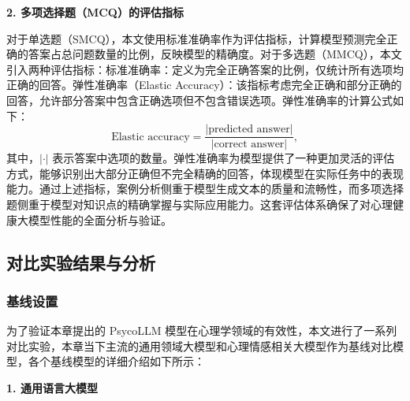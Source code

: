 \textbf{2. 多项选择题（MCQ）的评估指标}

对于单选题（SMCQ），本文使用标准准确率作为评估指标，计算模型预测完全正确的答案占总问题数量的比例，反映模型的精确度。对于多选题（MMCQ），本文引入两种评估指标：标准准确率：定义为完全正确答案的比例，仅统计所有选项均正确的回答。弹性准确率（Elastic Accuracy）：该指标考虑完全正确和部分正确的回答，允许部分答案中包含正确选项但不包含错误选项。弹性准确率的计算公式如下：
\begin{equation}
  \text{Elastic accuracy} = \frac{|\text{predicted answer}|}{|\text{correct answer}|},
\end{equation}
其中，$|\cdot|$ 表示答案中选项的数量。弹性准确率为模型提供了一种更加灵活的评估方式，能够识别出大部分正确但不完全精确的回答，体现模型在实际任务中的表现能力。通过上述指标，案例分析侧重于模型生成文本的质量和流畅性，而多项选择题侧重于模型对知识点的精确掌握与实际应用能力。这套评估体系确保了对心理健康大模型性能的全面分析与验证。

\subsection{对比实验结果与分析}

\subsubsection{基线设置}

为了验证本章提出的 PsycoLLM 模型在心理学领域的有效性，本文进行了一系列对比实验，本章当下主流的通用领域大模型和心理情感相关大模型作为基线对比模型，各个基线模型的详细介绍如下所示：

\textbf{1. 通用语言大模型}





